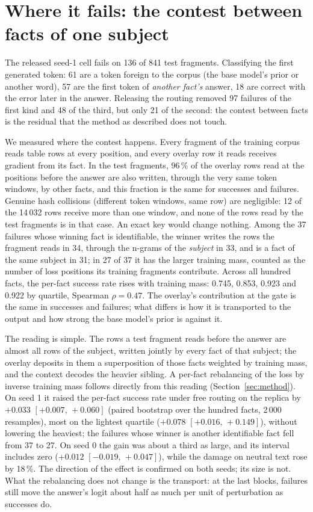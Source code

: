 \documentclass[10pt,a4paper]{article}
\begin{document}
\section{Where it fails: the contest between facts of one subject}
\label{sec:contest}

The released seed-1 cell fails on 136 of 841 test fragments. Classifying the first
generated token: 61 are a token foreign to the corpus (the base model's prior or another
word), 57 are the first token of \emph{another fact's} answer, 18 are correct with the
error later in the answer. Releasing the routing removed 97 failures of the first kind
and 48 of the third, but only 21 of the second: the contest between facts is the residual
that the method as described does not touch.

We measured where the contest happens. Every fragment of the training corpus reads table
rows at every position, and every overlay row it reads receives gradient from its fact. In the
test fragments, 96\,\% of the overlay rows read at the positions before the answer are
also written, through the very same token windows, by other facts, and this fraction is
the same for successes and failures. Genuine hash collisions (different token windows,
same row) are negligible: 12 of the 14\,032 rows receive more than one window, and none
of the rows read by the test fragments is in that case. An exact key would change nothing.
Among the 37 failures whose winning fact is identifiable, the winner writes the rows the
fragment reads in 34, through the n-grams of the \emph{subject} in 33, and is a fact of
the same subject in 31; in 27 of 37 it has the larger training mass, counted as the number
of loss positions its training fragments contribute. Across all hundred facts, the
per-fact success rate rises with training mass: 0.745, 0.853, 0.923 and 0.922 by quartile,
Spearman $\rho = 0.47$. The overlay's contribution at the gate is the same in successes
and failures; what differs is how it is transported to the output and how strong the base
model's prior is against it.

The reading is simple. The rows a test fragment reads before the answer are almost all
rows of the subject, written jointly by every fact of that subject; the overlay deposits
in them a superposition of those facts weighted by training mass, and the context decodes
the heavier sibling. A per-fact rebalancing of the loss by inverse training mass follows
directly from this reading (Section~\ref{sec:method}). On seed 1 it raised the per-fact
success rate under free routing on the replica by $+0.033$ $[+0.007,\,+0.060]$ (paired
bootstrap over the hundred facts, 2\,000 resamples), most on the lightest quartile
($+0.078$ $[+0.016,\,+0.149]$), without lowering the heaviest; the failures whose winner is
another identifiable fact fell from 37 to 27. On seed 0 the gain was about a third as
large, and its interval includes zero ($+0.012$ $[-0.019,\,+0.047]$), while the damage on
neutral text rose by 18\,\%. The direction of the effect is confirmed on both seeds; its
size is not. What the rebalancing does not change is the transport: at the last blocks,
failures still move the answer's logit about half as much per unit of perturbation as
successes do.
\end{document}
